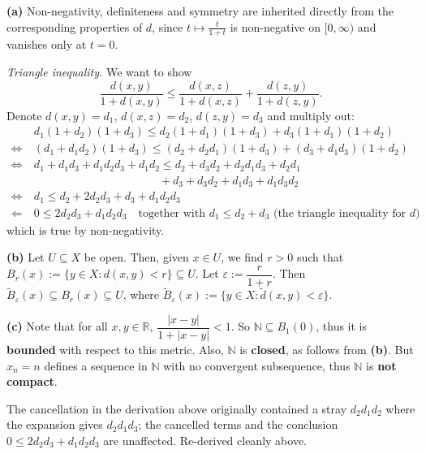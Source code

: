\begin{exercisesolution}
\textbf{(a)} Non-negativity, definiteness and symmetry are inherited directly from the
corresponding properties of $d$, since $t \mapsto \tfrac{t}{1+t}$ is non-negative on
$[0,\infty)$ and vanishes only at $t=0$.

\textit{Triangle inequality.} We want to show
\[
\frac{d(x,y)}{1+d(x,y)} \leq \frac{d(x,z)}{1+d(x,z)} + \frac{d(z,y)}{1+d(z,y)}.
\]
Denote $d(x,y) = d_1$, $d(x,z) = d_2$, $d(z,y) = d_3$ and multiply out:
\[
\begin{aligned}
&d_1(1+d_2)(1+d_3) \leq d_2(1+d_1)(1+d_3) + d_3(1+d_1)(1+d_2) \\
\iff\ & (d_1 + d_1d_2)(1+d_3) \leq (d_2 + d_2d_1)(1+d_3) + (d_3 + d_1d_3)(1+d_2) \\
\iff\ & d_1 + d_1d_3 + d_1d_2d_3 + d_1d_2 \leq d_2 + d_3d_2 + d_2d_1d_3 + d_2d_1 \\
& \qquad\qquad\qquad\qquad\qquad\quad + d_3 + d_3d_2 + d_1d_3 + d_1d_3d_2 \\
\iff\ & d_1 \leq d_2 + 2d_2d_3 + d_3 + d_1d_2d_3 \\
\Longleftarrow\ & 0 \leq 2d_2d_3 + d_1d_2d_3 \quad \text{together with } d_1 \leq d_2+d_3
  \text{ (the triangle inequality for } d\text{)}
\end{aligned}
\]
which is true by non-negativity.

\textbf{(b)} Let $U \subseteq X$ be open. Then, given $x \in U$, we find $r > 0$ such that
$B_r(x) := \{y \in X : d(x,y) < r\} \subseteq U$. Let $\varepsilon := \dfrac{r}{1+r}$. Then
$\tilde B_\varepsilon(x) \subseteq B_r(x) \subseteq U$, where
$\tilde B_\varepsilon(x) := \{y \in X : \tilde d(x,y) < \varepsilon\}$.

\textbf{(c)} Note that for all $x, y \in \mathbb{R}$, $\dfrac{|x-y|}{1+|x-y|} < 1$. So
$\mathbb{N} \subseteq B_1(0)$, thus it is \textbf{bounded} with respect to this metric. Also,
$\mathbb{N}$ is \textbf{closed}, as follows from \textbf{(b)}. But $x_n = n$ defines a sequence in
$\mathbb{N}$ with no convergent subsequence, thus $\mathbb{N}$ is \textbf{not compact}.
\end{exercisesolution}

\begin{ainote}
The cancellation in the derivation above originally contained a stray $d_2d_1d_2$ where the
expansion gives $d_2d_1d_3$; the cancelled terms and the conclusion $0 \leq 2d_2d_3 + d_1d_2d_3$
are unaffected. Re-derived cleanly above.
\end{ainote}

